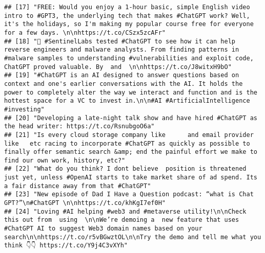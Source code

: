 \documentclass[
]{article}
\begin{document}
\begin{verbatim}
## [17] "FREE: Would you enjoy a 1-hour basic, simple English video intro to #GPT3, the underlying tech that makes #ChatGPT work? Well, it's the holidays, so I'm making my popular course free for everyone for a few days. \n\nhttps://t.co/CSzx5zcAFr"                                                                                      
## [18] "🤖 #SentinelLabs tested #ChatGPT to see how it can help reverse engineers and malware analysts. From finding patterns in #malware samples to understanding #vulnerabilities and exploit code, ChatGPT proved valuable. By  and  \n\nhttps://t.co/J8witxH9bO"                                                                          
## [19] "#ChatGPT is an AI designed to answer questions based on context and one's earlier conversations with the AI. It holds the power to completely alter the way we interact and function and is the hottest space for a VC to invest in.\n\n#AI #ArtificialIntelligence #investing"                                                       
## [20] "Developing a late-night talk show and have hired #ChatGPT as the head writer: https://t.co/RsnubgoO6a"                                                                                                                                                                                                                                
## [21] "Is every cloud storage company like      and email provider like   etc racing to incorporate #ChatGPT as quickly as possible to finally offer semantic search &amp; end the painful effort we make to find our own work, history, etc?"                                                                                               
## [22] "What do you think? I dont believe  position is threatened just yet, unless #OpenAI starts to take market share of ad spend. Its a fair distance away from that #ChatGPT"                                                                                                                                                              
## [23] "New episode of Dad I Have a Question podcast: “what is Chat GPT?”\n#ChatGPT \n\nhttps://t.co/khKgI7ef0H"                                                                                                                                                                                                                              
## [24] "Loving #AI helping #web3 and #metaverse utility!\n\nCheck this out from  using  \n\nWe’re demoing a  new feature that uses #ChatGPT AI to suggest Web3 domain names based on your search\n\nhttps://t.co/r5vBGwztOL\n\nTry the demo and tell me what you think 👇👇 https://t.co/Y9j4C3vXYh"                                          

\end{verbatim}
\end{document}
